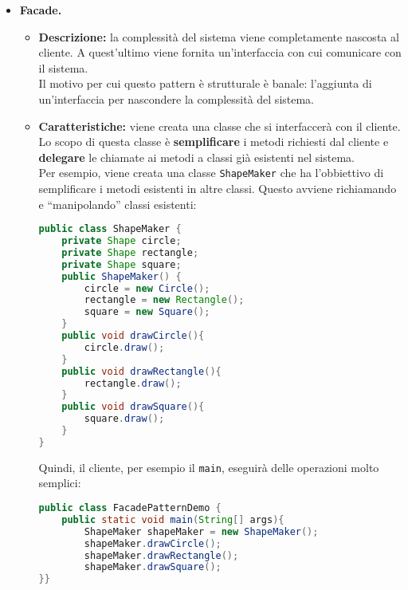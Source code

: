 \documentclass[a4paper,11pt]{article}
\begin{document}
\begin{itemize}
	\item[\ding{42}] \textbf{Facade.}
		\begin{itemize}
			\item \textbf{Descrizione:} la complessità del sistema viene completamente nascosta al cliente. A quest'ultimo viene fornita un'interfaccia con cui comunicare con il sistema.\\
			Il motivo per cui questo pattern è strutturale è banale: l'aggiunta di un'interfaccia per nascondere la complessità del sistema.\\
			\item \textbf{Caratteristiche:} viene creata una classe che si interfaccerà con il cliente. Lo scopo di questa classe è \textbf{semplificare} i metodi richiesti dal cliente e \textbf{delegare} le chiamate ai metodi a classi già esistenti nel sistema.\\
			Per esempio, viene creata una classe \texttt{ShapeMaker} che ha l'obbiettivo di semplificare i metodi esistenti in altre classi. Questo avviene richiamando e ``manipolando'' classi esistenti:
			\begin{lstlisting}[language=Java]
public class ShapeMaker {
	private Shape circle;
	private Shape rectangle;
	private Shape square;
	public ShapeMaker() {
		circle = new Circle(); 
		rectangle = new Rectangle(); 
		square = new Square();
	}
	public void drawCircle(){ 
		circle.draw();
	}
	public void drawRectangle(){ 
		rectangle.draw();
	}
	public void drawSquare(){ 
		square.draw();
	} 
}
			\end{lstlisting}
			Quindi, il cliente, per esempio il \texttt{main}, eseguirà delle operazioni molto semplici:
			\begin{lstlisting}[language=Java]
public class FacadePatternDemo {
	public static void main(String[] args){ 
		ShapeMaker shapeMaker = new ShapeMaker();
		shapeMaker.drawCircle();
		shapeMaker.drawRectangle();
		shapeMaker.drawSquare(); 
}}
			\end{lstlisting}
		\end{itemize}
	

\end{itemize}
\end{document}
